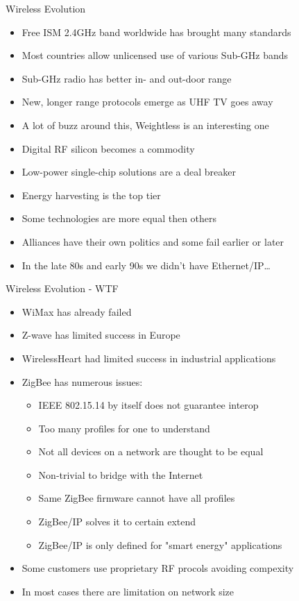 \documentclass{beamer}
\begin{document}
\begin{frame}{Wireless Evolution}
\begin{itemize}
  \item Free ISM 2.4GHz band worldwide has brought many standards
  \item Most countries allow unlicensed use of various Sub-GHz bands
  \item Sub-GHz radio has better in- and out-door range
  \item New, longer range protocols emerge as UHF TV goes away
  \item A lot of buzz around this, Weightless is an interesting one
  \item Digital RF silicon becomes a commodity
  \item Low-power single-chip solutions are a deal breaker
  \item Energy harvesting is the top tier
  \item Some technologies are more equal then others
  \item Alliances have their own politics and some fail earlier or later 
  \item In the late 80s and early 90s we didn't have Ethernet/IP\dots
\end{itemize}
\end{frame}
\begin{frame}{Wireless Evolution - WTF}
\begin{itemize}
  \item WiMax has already failed
  \item Z-wave has limited success in Europe
  \item WirelessHeart had limited success in industrial applications
  \item ZigBee has numerous issues:
  \begin{itemize}
    \item IEEE 802.15.14 by itself does not guarantee interop
    \item Too many profiles for one to understand
    \item Not all devices on a network are thought to be equal
    \item Non-trivial to bridge with the Internet
    \item Same ZigBee firmware cannot have all profiles
    \item ZigBee/IP solves it to certain extend
    \item ZigBee/IP is only defined for "smart energy" applications
  \end{itemize}
  \item Some customers use proprietary RF procols avoiding compexity
  \item In most cases there are limitation on network size
\end{itemize}
\end{frame}
\end{document}
